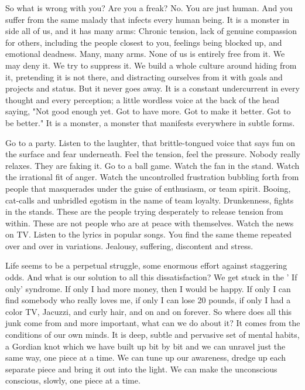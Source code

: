 So what is wrong with you? Are you a freak? No. You are just human. And you
suffer from the same malady that infects every human being. It is a monster in
side all of us, and it has many arms: Chronic tension, lack of genuine
compassion for others, including the people closest to you, feelings being
blocked up, and emotional deadness. Many, many arms. None of us is entirely free
from it. We may deny it. We try to suppress it. We build a whole culture around
hiding from it, pretending it is not there, and distracting ourselves from it
with goals and projects and status. But it never goes away. It is a constant
undercurrent in every thought and every perception; a little wordless voice at
the back of the head saying, "Not good enough yet. Got to have more. Got to make
it better. Got to be better." It is a monster, a monster that manifests
everywhere in subtle forms.

Go to a party. Listen to the laughter, that brittle-tongued voice that says fun
on the surface and fear underneath. Feel the tension, feel the pressure. Nobody
really relaxes. They are faking it. Go to a ball game. Watch the fan in the
stand. Watch the irrational fit of anger. Watch the uncontrolled frustration
bubbling forth from people that masquerades under the guise of enthusiasm, or
team spirit. Booing, cat-calls and unbridled egotism in the name of team
loyalty. Drunkenness, fights in the stands. These are the people trying
desperately to release tension from within. These are not people who are at
peace with themselves. Watch the news on TV. Listen to the lyrics in popular
songs. You find the same theme repeated over and over in variations. Jealousy,
suffering, discontent and stress.

Life seems to be a perpetual struggle, some enormous effort against staggering
odds. And what is our solution to all this dissatisfaction? We get stuck in the
' If only' syndrome. If only I had more money, then I would be happy. If only I
can find somebody who really loves me, if only I can lose 20 pounds, if only I
had a color TV, Jacuzzi, and curly hair, and on and on forever. So where does
all this junk come from and more important, what can we do about it? It comes
from the conditions of our own minds. It is deep, subtle and pervasive set of
mental habits, a Gordian knot which we have built up bit by bit and we can
unravel just the same way, one piece at a time. We can tune up our awareness,
dredge up each separate piece and bring it out into the light. We can make the
unconscious conscious, slowly, one piece at a time.

